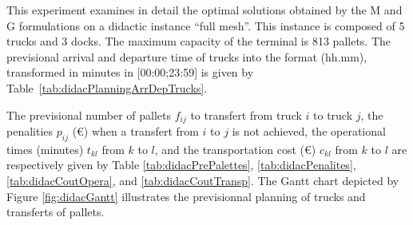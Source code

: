\documentclass[preprint,12pt,authoryear]{elsarticle}
\begin{document}
This experiment examines in detail  the optimal solutions obtained by the M and G formulations on a didactic instance
 ``full mesh''.
This instance is composed of 5 trucks and 3 docks.
The  maximum capacity of the terminal is 813 pallets.
%
The previsional arrival and departure time of trucks into the format  (hh.mm), transformed in minutes in [00:00;23:59] is given by Table~\ref{tab:didacPlanningArrDepTrucks}.
%


The previsional number of pallets  $f_{ij}$ to transfert from truck $i$ to truck $j$,
the penalities $p_{ij}$ (\euro) when a transfert from $i$ to $j$ is not achieved, 
the operational times (minutes)  $t_{kl}$ from $k$ to $l$, and 
the transportation cost (\euro) $c_{kl}$ from $k$ to $l$
are respectively given by 
Table \ref{tab:didacPrePalettes},
 \ref{tab:didacPenalites},
 \ref{tab:didacCoutOpera}, and 
 \ref{tab:didacCoutTransp}.
 The Gantt chart depicted by Figure \ref{fig:didacGantt} illustrates the previsionnal planning of trucks and transferts of pallets.
\end{document}
